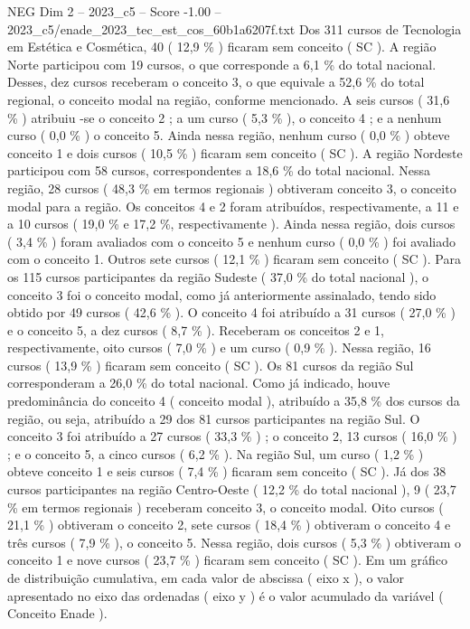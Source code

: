 \begin{textsample}{NEG Dim 2 – 2023\_c5 – Score -1.00 – 2023\_c5/enade\_2023\_tec\_est\_cos\_60b1a6207f.txt}
Dos 311 cursos de Tecnologia em Estética e Cosmética, 40 ( 12,9 \% ) ficaram sem conceito ( SC ).
A região Norte participou com 19 cursos, o que corresponde a 6,1 \% do total nacional.
Desses, dez cursos receberam o conceito 3, o que equivale a 52,6 \% do total regional, o conceito modal na região, conforme mencionado.
A seis cursos ( 31,6 \% ) atribuiu -se o conceito 2 ; a um curso ( 5,3 \% ), o conceito 4 ; e a nenhum curso ( 0,0 \% ) o conceito 5.
Ainda nessa região, nenhum curso ( 0,0 \% ) obteve conceito 1 e dois cursos ( 10,5 \% ) ficaram sem conceito ( SC ).
A região Nordeste participou com 58 cursos, correspondentes a 18,6 \% do total nacional.
Nessa região, 28 cursos ( 48,3 \% em termos regionais ) obtiveram conceito 3, o conceito modal para a região.
Os conceitos 4 e 2 foram atribuídos, respectivamente, a 11 e a 10 cursos ( 19,0 \% e 17,2 \%, respectivamente ).
Ainda nessa região, dois cursos ( 3,4 \% ) foram avaliados com o conceito 5 e nenhum curso ( 0,0 \% ) foi avaliado com o conceito 1.
Outros sete cursos ( 12,1 \% ) ficaram sem conceito ( SC ).
Para os 115 cursos participantes da região Sudeste ( 37,0 \% do total nacional ), o conceito 3 foi o conceito modal, como já anteriormente assinalado, tendo sido obtido por 49 cursos ( 42,6 \% ).
O conceito 4 foi atribuído a 31 cursos ( 27,0 \% ) e o conceito 5, a dez cursos ( 8,7 \% ).
Receberam os conceitos 2 e 1, respectivamente, oito cursos ( 7,0 \% ) e um curso ( 0,9 \% ).
Nessa região, 16 cursos ( 13,9 \% ) ficaram sem conceito ( SC ).
Os 81 cursos da região Sul corresponderam a 26,0 \% do total nacional.
Como já indicado, houve predominância do conceito 4 ( conceito modal ), atribuído a 35,8 \% dos cursos da região, ou seja, atribuído a 29 dos 81 cursos participantes na região Sul.
O conceito 3 foi atribuído a 27 cursos ( 33,3 \% ) ; o conceito 2, 13 cursos ( 16,0 \% ) ; e o conceito 5, a cinco cursos ( 6,2 \% ).
Na região Sul, um curso ( 1,2 \% ) obteve conceito 1 e seis cursos ( 7,4 \% ) ficaram sem conceito ( SC ).
Já dos 38 cursos participantes na região Centro-Oeste ( 12,2 \% do total nacional ), 9 ( 23,7 \% em termos regionais ) receberam conceito 3, o conceito modal.
Oito cursos ( 21,1 \% ) obtiveram o conceito 2, sete cursos ( 18,4 \% ) obtiveram o conceito 4 e três cursos ( 7,9 \% ), o conceito 5.
Nessa região, dois cursos ( 5,3 \% ) obtiveram o conceito 1 e nove cursos ( 23,7 \% ) ficaram sem conceito ( SC ).
Em um gráfico de distribuição cumulativa, em cada valor de abscissa ( eixo x ), o valor apresentado no eixo das ordenadas ( eixo y ) é o valor acumulado da variável ( Conceito Enade ).

\end{textsample}
